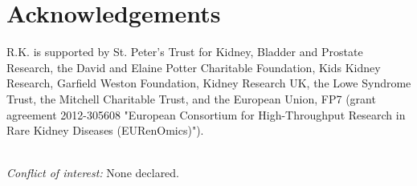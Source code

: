 
\vspace{-10pt}
\section*{Acknowledgements}

R.K. is supported by St. Peter's Trust for Kidney, Bladder and Prostate Research, the David and Elaine Potter Charitable Foundation, Kids Kidney Research, Garfield Weston Foundation, Kidney Research UK, the Lowe Syndrome Trust, the Mitchell Charitable Trust, and the European Union, FP7 (grant agreement 2012-305608 "European Consortium for High-Throughput Research in Rare Kidney Diseases (EURenOmics)").\\\

\noindent
\textit{Conflict of interest:} None declared.



